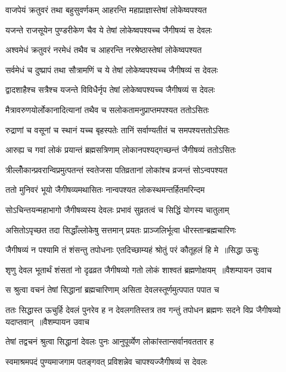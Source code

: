 \twolineshloka
{वाजपेयं क्रतुवरं तथा बहुसुवर्णकम्}
{आहरन्ति महाप्राज्ञास्तेषां लोकेष्वपश्यत}


\twolineshloka
{यजन्ते राजसूयेन पुण्डरीकेण चैव ये}
{तेषां लोकेष्वपश्यच्च जैगीषव्यं स देवलः}


\twolineshloka
{अश्वमेधं क्रतुवरं नरमेधं तथैव च}
{आहरन्ति नरश्रेष्ठास्तेषां लोकेष्वपश्यत}


\twolineshloka
{सर्वमेधं च दुष्प्रापं तथा सौत्रामणिं च ये}
{तेषां लोकेष्वपश्यच्च जैगीषव्यं स देवलः}


\twolineshloka
{द्वादशाहैश्च सत्रैश्च यजन्ते विविधैर्नृप}
{तेषां लोकेष्वपश्यच्च जैगीषव्यं स देवलः}


\twolineshloka
{मैत्रावरुणयोर्लोकानादित्यानां तथैव च}
{सलोकतामनुप्राप्तमपश्यत ततोऽसितः}


\twolineshloka
{रुद्राणां च वसूनां च स्थानं यच्च बृहस्पतेः}
{तानिं सर्वाण्यतीतं च समपश्यत्ततोऽसितः}


\twolineshloka
{आरुह्य च गवां लोकं प्रयान्तं ब्रह्मसत्रिणाम्}
{लोकानपश्यद्गच्छन्तं जैगीषव्यं ततोऽसितः}


\twolineshloka
{त्रील्लोँकान्प्रवरान्विप्रमुत्पतन्तं स्वतेजसा}
{पतिव्रतानां लोकांश्च व्रजन्तं सोऽन्वपश्यत}


\twolineshloka
{ततो मुनिवरं भूयो जैगीषव्यमथासितः}
{नान्वपश्यत लोकस्थमन्तर्हितमरिन्दम}


\twolineshloka
{सोऽचिन्तयन्महाभागो जैगीषव्यस्य देवलः}
{प्रभावं सुव्रतत्वं च सिद्धिं योगस्य चातुलाम्}


\twolineshloka
{असितोऽपृच्छत तदा सिद्धाँल्लोकेषु सत्तमान्}
{प्रयतः प्राञ्जलिर्भूत्वा धीरस्तान्ब्रह्मचारिणः}


\threelineshloka
{जैगीषव्यं न पश्यामि तं शंसन्तु तपोधनाः}
{एतदिच्छाम्यहं श्रोतुं परं कौतूहलं हि मे ॥सिद्धा ऊचुः}
{}


\threelineshloka
{शृणु देवल भूतार्थं शंसतां नो दृढव्रत}
{जैगीषव्यो गतो लोकं शाश्वतं ब्रह्मणोक्षयम् ॥वैशम्पायन उवाच}
{}


\twolineshloka
{स श्रुत्वा वचनं तेषां सिद्धानां ब्रह्मचारिणाम्}
{असिता देवलस्तूर्णमुत्पपात पपात च}


\fourlineindentedshloka
{ततः सिद्धास्त ऊचुर्हि देवलं पुनरेव ह}
{न देवलगतिस्तत्र तव गन्तुं तपोधन}
{ब्रह्मणः सदने विप्र जैगीषव्यो यदाप्तवान् ॥वैशम्पायन उवाच}
{}


\twolineshloka
{तेषां तद्वचनं श्रुत्वा सिद्धानां देवलः पुनः}
{आनुपूर्व्येण लोकांस्तान्सर्वानवततार ह}


\twolineshloka
{स्वमाश्रमपदं पुण्यमाजगाम पतङ्गवत्}
{प्रविशन्नेव चापश्यज्जैगीषव्यं स देवलः}


